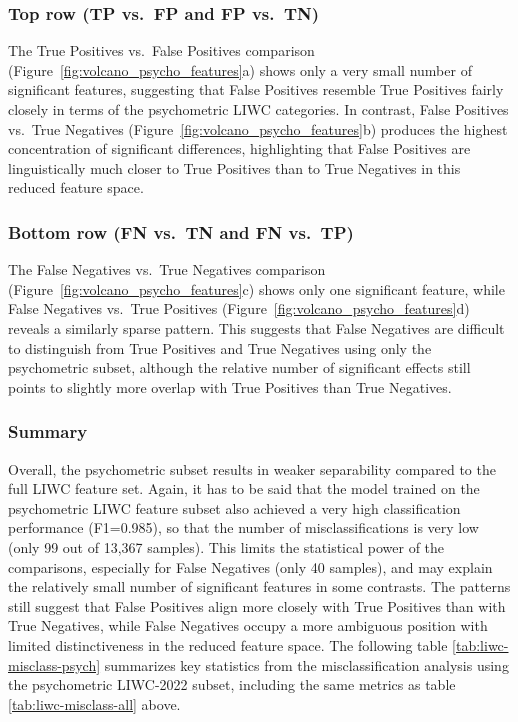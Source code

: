\subsubsection{Top row (TP vs.\ FP and FP vs.\ TN)}
The True Positives vs.\ False Positives comparison (Figure~\ref{fig:volcano_psycho_features}a) shows only a very small number of significant features, 
suggesting that False Positives resemble True Positives fairly closely in terms of the psychometric LIWC categories.  
In contrast, False Positives vs.\ True Negatives (Figure~\ref{fig:volcano_psycho_features}b) produces the highest concentration of significant differences, 
highlighting that False Positives are linguistically much closer to True Positives than to True Negatives in this reduced feature space.

\subsubsection{Bottom row (FN vs.\ TN and FN vs.\ TP)}
The False Negatives vs.\ True Negatives comparison (Figure~\ref{fig:volcano_psycho_features}c) shows only one significant feature, 
while False Negatives vs.\ True Positives (Figure~\ref{fig:volcano_psycho_features}d) reveals a similarly sparse pattern. 
This suggests that False Negatives are difficult to distinguish from True Positives and True Negatives using only the psychometric subset, although the relative number of significant effects still points to slightly more overlap with True Positives than True Negatives.

\subsubsection{Summary}
Overall, the psychometric subset results in weaker separability compared to the full LIWC feature set. Again, it has to be said that the model trained on the psychometric LIWC feature subset also achieved a very high classification performance (F1=0.985), so that the number of misclassifications is very low (only 99 out of 13,367 samples). This limits the statistical power of the comparisons, especially for False Negatives (only 40 samples), and may explain the relatively small number of significant features in some contrasts. The patterns still suggest that False Positives align more closely with True Positives than with True Negatives, while False Negatives occupy a more ambiguous position with limited distinctiveness in the reduced feature space. The following table \ref{tab:liwc-misclass-psych} summarizes key statistics from the misclassification analysis using the psychometric LIWC-2022 subset, including the same metrics as table \ref{tab:liwc-misclass-all} above.

